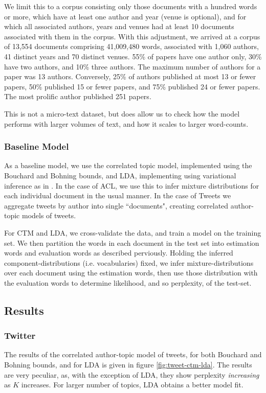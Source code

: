 We limit this to a corpus consisting only those documents with a hundred words or more, which have at least one author and year (venue is optional), and for which all associated authors, years and venues had at least 10 documents associated with them in the corpus. With this adjustment, we arrived at a corpus of 13,554 documents comprising 41,009,480 words, associated with 1,060 authors, 41 distinct years and 70 distinct venues. 55\% of papers have one author only, 30\% have two authors, and 10\% three authors. The maximum number of authors for a paper was 13 authors. Conversely, 25\% of authors published at most 13 or fewer papers, 50\% published 15 or fewer papers, and 75\% published 24 or fewer papers. The most prolific author published 251 papers.

This is not a micro-text dataset, but does allow us to check how the model performs with larger volumes of text, and how it scales to larger word-counts.

\subsubsection{Baseline Model}
As a baseline model, we use the correlated topic model, implemented using the Bouchard and Bohning bounds, and LDA, implementing using variational inference as in \cite{BleiNgJordan2003}. In the case of ACL, we use this to infer mixture distributions for each individual document in the usual manner. In the case of Tweets we aggregate tweets by author into single ``documents", creating correlated author-topic models of tweets.

For CTM and LDA, we cross-validate the data, and train a model on the training set. We then partition the words in each document in the test set into estimation words and evaluation words as described perviously. Holding the inferred component-distributions (i.e. vocabularies) fixed, we infer mixture-distributions over each document using the estimation words, then use those distribution with the evaluation words to determine likelihood, and so perplexity, of the test-set.

\subsection{Results}
\subsubsection*{Twitter}
The results of the correlated author-topic model of tweets, for both Bouchard and Bohning bounds, and for LDA is given in figure \ref{fig:tweet-ctm-lda}. The results are very peculiar, as, with the exception of LDA, they show perplexity \emph{increasing} as $K$ increases. For larger number of topics, LDA obtains a better model fit.


